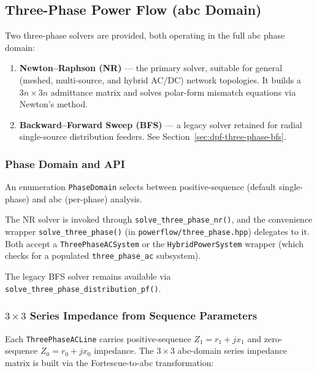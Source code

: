 \subsection{Three-Phase Power Flow (abc Domain)}
\label{sec:dpf-three-phase}

Two three-phase solvers are provided, both operating in the full abc phase
domain:
\begin{enumerate}
  \item \textbf{Newton--Raphson (NR)} --- the primary solver, suitable for
        general (meshed, multi-source, and hybrid AC/DC) network topologies.
        It builds a $3n\times3n$ admittance matrix and solves polar-form
        mismatch equations via Newton's method.
  \item \textbf{Backward--Forward Sweep (BFS)} --- a legacy solver retained for
        radial single-source distribution feeders.  See
        Section~\ref{sec:dpf-three-phase-bfs}.
\end{enumerate}

\subsubsection{Phase Domain and API}

An enumeration \texttt{PhaseDomain} selects between positive-sequence (default
single-phase) and abc (per-phase) analysis.

The NR solver is invoked through \texttt{solve\_three\_phase\_nr()}, and the
convenience wrapper \texttt{solve\_three\_phase()} (in
\texttt{powerflow/three\_phase.hpp}) delegates to it.
Both accept a \texttt{ThreePhaseACSystem} or the \texttt{HybridPowerSystem}
wrapper (which checks for a populated \texttt{three\_phase\_ac} subsystem).

The legacy BFS solver remains available via
\texttt{solve\_three\_phase\_distribution\_pf()}.

\subsubsection{\texorpdfstring{$3\times3$}{3x3} Series Impedance from Sequence Parameters}

Each \texttt{ThreePhaseACLine} carries positive-sequence $Z_1 = r_1 + jx_1$ and
zero-sequence $Z_0 = r_0 + jx_0$ impedance.  The $3\times3$ abc-domain series
impedance matrix is built via the Fortescue-to-abc transformation:


